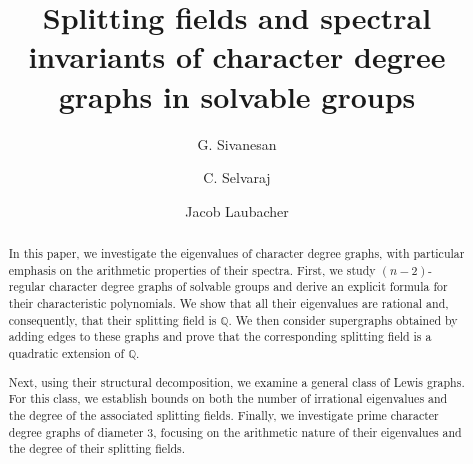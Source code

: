 \documentclass[11pt]{amsart}
\date{}
\begin{document}
\title[Splitting fields and spectral invariants]{Splitting fields and spectral invariants of character degree graphs in solvable groups}

 
\author [G. Sivanesan]{G. Sivanesan}
\address{Department of Mathematics, Government College of Engineering, Salem 636011, Tamil Nadu, India, ORCID: 0000-0001-7153-960X.}


\author [C. Selvaraj]{C. Selvaraj}
\address{Department of Mathematics, Periyar University, Salem 636011, Tamil Nadu, India,  ORCID:  0000-0002-4050-3177.}


\author[Laubacher]{Jacob Laubacher}
\address{Department of Mathematics, Hillsdale College, Hillsdale, Michigan 49242, USA, ORCID:0000-0003-0045-7951.}






\begin{abstract}
In this paper, we investigate the eigenvalues of character degree graphs, 
with particular emphasis on the arithmetic properties of their spectra. 
First, we study \((n-2)\)-regular character degree graphs of solvable groups 
and derive an explicit formula for their characteristic polynomials. We show 
that all their eigenvalues are rational and, consequently, that their splitting 
field is \(\mathbb{Q}\). We then consider supergraphs obtained by adding edges 
to these graphs and prove that the corresponding splitting field is a quadratic 
extension of \(\mathbb{Q}\).

Next, using their structural decomposition, we examine a general class of Lewis 
graphs. For this class, we establish bounds on both the number of irrational 
eigenvalues and the degree of the associated splitting fields. Finally, we 
investigate prime character degree graphs of diameter \(3\), focusing on the 
arithmetic nature of their eigenvalues and the degree of their splitting fields.
\end{abstract}


\date{}
\maketitle
 
\end{document}
